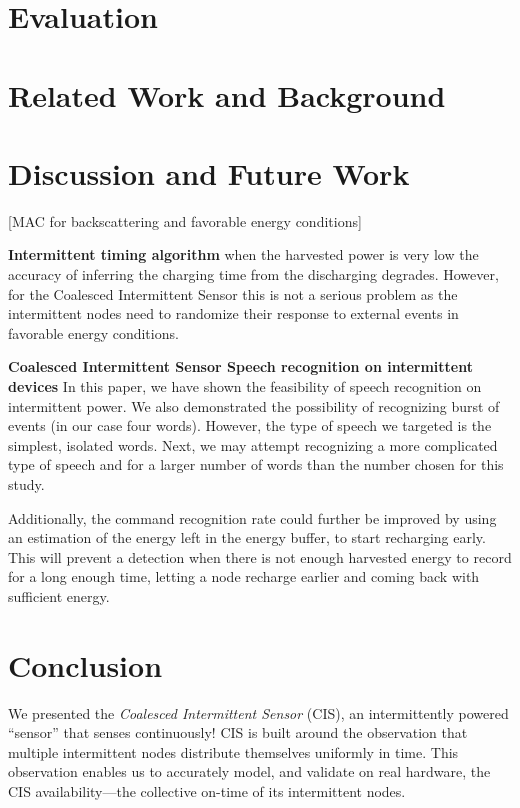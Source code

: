 \documentclass[sigconf, anonymous]{acmart}
\newcommand{\todo}[1]{}
\renewcommand{\todo}[1]{{\color{red} [{#1}]}}
\newcommand{\sys}{CIS\xspace}
\newcommand{\fullsys}{Coalesced Intermittent Sensor\xspace}
\begin{document}
\section{Evaluation}
\label{sec:evaluation}


\section{Related Work and Background}
\label{sec:relatedwork}


\section{Discussion and Future Work}
\label{sec:discussion}

\todo{MAC for backscattering and favorable energy conditions}

\noindent\textbf{Intermittent timing algorithm} when the harvested power is very low the accuracy of inferring the charging time from the discharging degrades. However, for the \fullsys this is not a serious problem as the intermittent nodes need to randomize their response to external events in favorable energy conditions. 


\noindent\textbf{\fullsys Speech recognition on intermittent devices} In this paper, we have shown the feasibility of speech recognition on intermittent power. We also demonstrated the possibility of recognizing burst of events (in our case four words). However, the type of speech we targeted is the simplest, isolated words. Next, we may attempt recognizing a more complicated type of speech and for a larger number of words than the number chosen for this study.

Additionally, the command recognition rate could further be improved by using an estimation of the energy left in the energy buffer, to start recharging early. This will prevent a detection when there is not enough harvested energy to record for a long enough time, letting a node recharge earlier and coming back with sufficient energy.

\section{Conclusion}

We presented the \textit{\fullsys} (\sys), an intermittently powered ``sensor'' that senses continuously! \sys is built around the observation that multiple intermittent nodes distribute themselves uniformly in time. This observation enables us to accurately model, and validate on real hardware, the \sys availability---the collective on-time of its intermittent nodes. 
\end{document}
